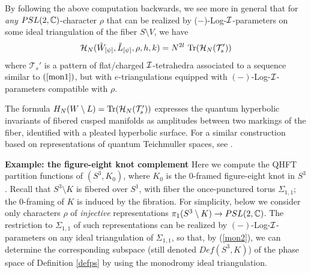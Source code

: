 By following the above computation backwards, we see more in general
that for {\it any} $PSL(2,\mathbb{C})$-character $\rho$ that can be realized
by ($-$)-Log-${\mathcal I}$-parameters on some ideal triangulation of the fiber
$S\setminus V$, we have
\begin{equation}\label{mon2}
{\mathcal H}_N(\tilde{W}_{[\psi]},\tilde{L}_{[\psi]},\rho,h,k) = N^{2l}\ {\rm
Tr}( {\mathcal H}_N(\mathcal{T}_s'))
\end{equation}
where $\mathcal{T}_s'$ is a pattern of flat/charged ${\mathcal I}$-tetrahedra
associated to a sequence similar to $(\ref{mon1})$, but with
$e$-triangulations equipped with $(-)$-Log-${\mathcal I}$-parameters compatible
with $\rho$.
\begin{remark}\label{QTeich}{\rm The formula $H_N(W\setminus
L) = {\rm Tr}({\mathcal H}_N({\mathcal T}_{s}'))$ expresses the quantum hyperbolic
invariants of fibered cusped manifolds as amplitudes between two
markings of the fiber, identified with a pleated hyperbolic
surface. For a similar construction based on representations of
quantum Teichmuller spaces, see \cite{BoL}.}
\end{remark}
{\bf Example: the figure-eight knot complement}\label{EXAMPLES}
Here we compute the QHFT partition functions of $(S^3,K_0)$, where
$K_0$ is the $0$-framed figure-eight knot in $S^3$. Recall that
$S^3\setminus K$ is fibered over $S^1$, with fiber the once-punctured
torus $\Sigma_{1,1}$; the $0$-framing of $K$ is induced by the
fibration. For simplicity, below we consider only characters $\rho$ of
{\it injective} representations $\pi_1(S^3\setminus K)\rightarrow
PSL(2,\mathbb{C})$. The restriction to $\Sigma_{1,1}$ of such representations
can be realized by $(-)$-Log-${\mathcal I}$-parameters on any ideal
triangulation of $\Sigma_{1,1}$, so that, by (\ref{mon2}), we can
determine the corresponding subspace (still denoted $Def(S^3,K)$) of
the phase space of Definition \ref{defps} by using the monodromy ideal
triangulation.
\smallskip

